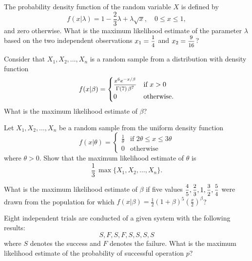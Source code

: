 \begin{mdframed}
    \vspace{0.752cm}
    \begin{Exercise}
        The probability density function of the random variable $X$ is defined by 
        \[
            f(x|\lambda) = 1 - \frac{2}{3}\lambda + \lambda \sqrt{x}, \quad 0 \leq x \leq 1,
        \]
        and zero otherwise. What is the maximum likelihood estimate of the parameter $\lambda$ based on the 
        two independent observations $x_1 = \mfrac{1}{4}$ and $x_2 = \mfrac{9}{16}$?
    \end{Exercise}

    \vspace{0.752cm}
    \begin{Exercise}
        Consider that $X_1, X_2, \ldots, X_n$ is a random sample from a distribution with density 
        function
        \[
            f(x|\beta) = \begin{cases}
                \mfrac{x^6 e^{-x/\beta}}{\Gamma(7)\, \beta^7} & \text{if } x > 0\\
                0 & \text{otherwise}.
            \end{cases}
        \]
        What is the maximum likelihood estimate of $\beta$?
    \end{Exercise}

    \vspace{0.752cm}
    \begin{Exercise}
        Let $X_1, X_2, \ldots, X_n$ be a random sample from the uniform density 
        function
        \[
            f(x|\theta) = \begin{cases}
                \frac{1}{\theta} & \text{if } 2\theta \leq x \leq 3\theta\\
                0 & \text{otherwise}
            \end{cases}
        \]
        where $\theta > 0$. Show that the maximum likelihood estimate of $\theta$ is 
        \[
            \frac{1}{3}\, \max \{ X_1, X_2,\ldots ,X_n\}.
        \]
    \end{Exercise}

    \begin{Exercise}
        What is the maximum likelihood estimate of $\beta$ if five values 
        $\mfrac{4}{5}, \mfrac{2}{3}, 1, \mfrac{3}{2}, \mfrac{5}{4}$ were drawn from the 
        population for which
        $\displaystyle f(x|\beta) = \frac{1}{2}(1 + \beta)^5 \left(\frac{x}{2}\right)^\beta$?
    \end{Exercise}

    \begin{Exercise}
        Eight independent trials are conducted of a given system with the following results: 
        \[S, F, S, F, S, S, S, S\] 
    where $S$ denotes the success and $F$ denotes
    the failure. What is the maximum likelihood estimate of the probability of
    successful operation $p$?
    \end{Exercise}


\end{mdframed}
